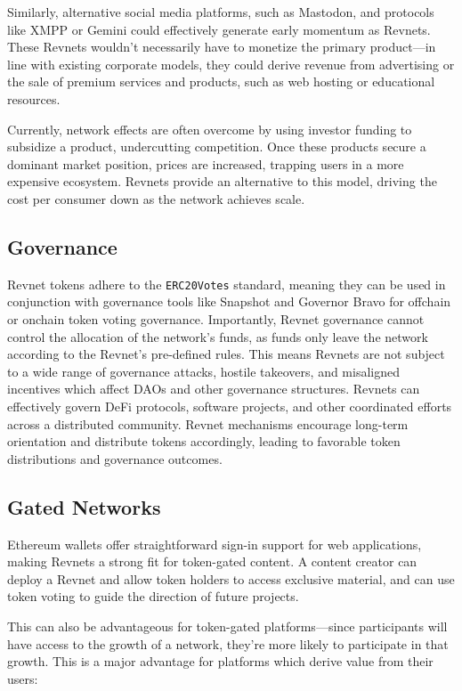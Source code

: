 \documentclass{article}
\begin{document}
Similarly, alternative social media platforms, such as Mastodon, and protocols like XMPP or Gemini could effectively generate early momentum as Revnets. These Revnets wouldn't necessarily have to monetize the primary product---in line with existing corporate models, they could derive revenue from advertising or the sale of premium services and products, such as web hosting or educational resources. 

Currently, network effects are often overcome by using investor funding to subsidize a product, undercutting competition. Once these products secure a dominant market position, prices are increased, trapping users in a more expensive ecosystem. Revnets provide an alternative to this model, driving the cost per consumer down as the network achieves scale.

\subsection{Governance}

Revnet tokens adhere to the \texttt{ERC20Votes} standard, meaning they can be used in conjunction with governance tools like Snapshot and Governor Bravo for offchain or onchain token voting governance. Importantly, Revnet governance cannot control the allocation of the network's funds, as funds only leave the network according to the Revnet's pre-defined rules. This means Revnets are not subject to a wide range of governance attacks, hostile takeovers, and misaligned incentives which affect DAOs and other governance structures. Revnets can effectively govern DeFi protocols, software projects, and other coordinated efforts across a distributed community. Revnet mechanisms encourage long-term orientation and distribute tokens accordingly, leading to favorable token distributions and governance outcomes.

\subsection{Gated Networks}

Ethereum wallets offer straightforward sign-in support for web applications, making Revnets a strong fit for token-gated content. A content creator can deploy a Revnet and allow token holders to access exclusive material, and can use token voting to guide the direction of future projects.

This can also be advantageous for token-gated platforms---since participants will have access to the growth of a network, they're more likely to participate in that growth. This is a major advantage for platforms which derive value from their users:
\end{document}
